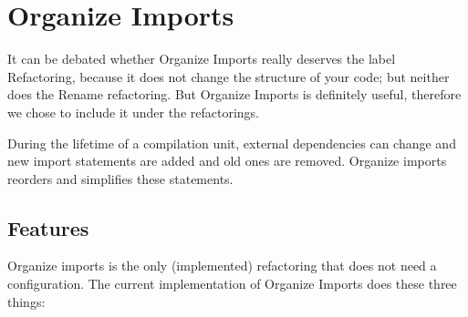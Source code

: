 \documentclass[10pt,a4paper,oneside]{scrreprt}
\begin{document}
\section{Organize Imports}

It can be debated whether Organize Imports really deserves the label Refactoring, because it does not change the structure of your code; but neither does the Rename refactoring. But Organize Imports is definitely useful, therefore we chose to include it under the refactorings.

During the lifetime of a compilation unit, external dependencies can change and new import statements are added and old ones are removed. Organize imports reorders and simplifies these statements.

\subsection{Features}

Organize imports is the only (implemented) refactoring that does not need a configuration. The current implementation of Organize Imports does these three things:
\end{document}
